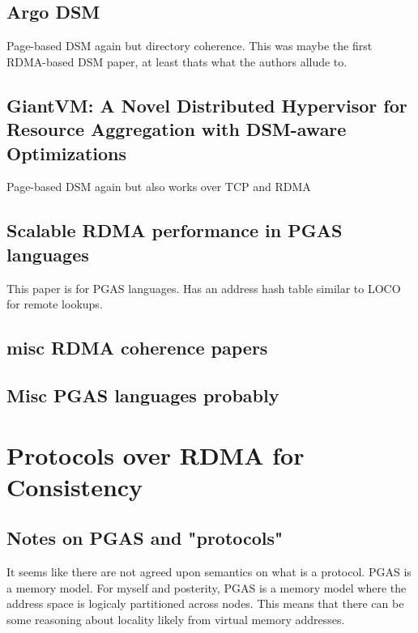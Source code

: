 \documentclass[sigplan,nonacm]{acmart}
\begin{document}
    \subsection{Argo DSM}
    Page-based DSM again but directory coherence. This was maybe the first RDMA-based DSM paper, 
    at least thats what the authors allude to.\cite{Kaxiras-HPDC-2015}

    \subsection {GiantVM: A Novel Distributed Hypervisor for Resource Aggregation with DSM-aware Optimizations}
    Page-based DSM again but also works over TCP and RDMA\cite{Jia-ACO-2022}

    \subsection{Scalable RDMA performance in PGAS languages}
    This paper is for PGAS languages. Has an address hash table similar to LOCO for remote lookups.\cite{Farreras-IPDPS-2009}

    \subsection {misc RDMA coherence papers}

    \subsection{Misc PGAS languages probably}
\section{Protocols over RDMA for Consistency}

    \subsection{Notes on PGAS and "protocols"}
    It seems like there are not agreed upon semantics on what is a protocol. PGAS is a 
    memory model. For myself and posterity, PGAS is a memory model where the address space is logicaly partitioned across nodes.
    This means that there can be some reasoning about locality likely from virtual memory addresses.
\end{document}
